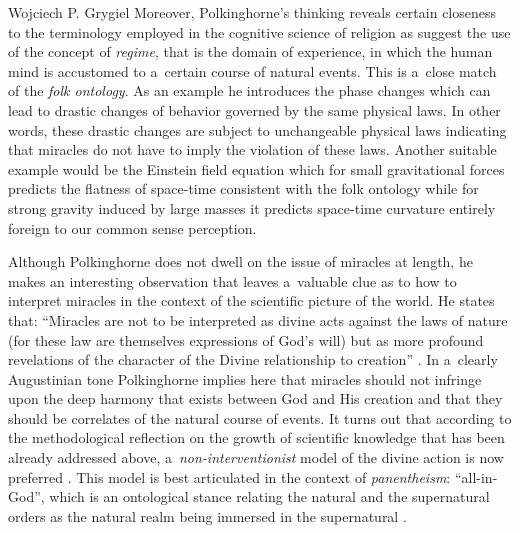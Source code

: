 \begin{artengenv}{Wojciech P. Grygiel}
{}
Moreover, Polkinghorne’s thinking reveals certain closeness to the terminology employed in the cognitive science of religion as suggest the use of the concept of \textit{regime}, that is the domain of experience, in which the human mind is accustomed to a~certain course of natural events. This is a~close match of the \textit{folk ontology}. As an example he introduces the phase changes which can lead to drastic changes of behavior governed by the same physical laws. In other words, these drastic changes are subject to unchangeable physical laws indicating that miracles do not have to imply the violation of these laws. Another suitable example would be the Einstein field equation which for small gravitational forces predicts the flatness of space-time consistent with the folk ontology while for strong gravity induced by large masses it predicts space-time curvature entirely foreign to our common sense perception.

Although Polkinghorne does not dwell on the issue of miracles at length, he makes an interesting observation that leaves a~valuable clue as to how to interpret miracles in the context of the scientific picture of the world. He states that: ``Miracles are not to be interpreted as divine acts against the laws of nature (for these law are themselves expressions of God’s will) but as more profound revelations of the character of the Divine relationship to creation''
\parencite[][p.93]{polkinghorne_science_1998}. %
 In a~clearly Augustinian tone Polkinghorne implies here that miracles should not infringe upon the deep harmony that exists between God and His creation and that they should be correlates of the natural course of events. It turns out that according to the methodological reflection on the growth of scientific knowledge that has been already addressed above, a~\textit{non-interventionist} model of the divine action is now preferred 
\parencite[e.g.][pp.117–121]{heller_sens_2002}. %
 This model is best articulated in the context of \textit{panentheism}: ``all-in-God'', which is an ontological stance relating the natural and the supernatural orders as the natural realm being immersed in the supernatural 
\parencite[e.g.][]{clayton_whom_2004}.%



\end{artengenv}
